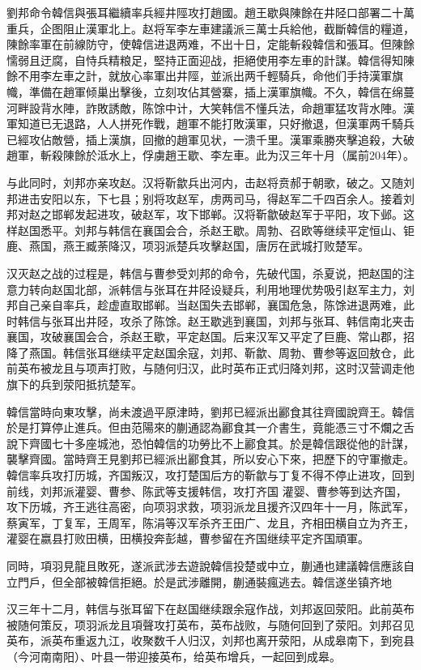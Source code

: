 劉邦命令韓信與張耳繼續率兵經井陘攻打趙國。趙王歇與陳餘在井陉口部署二十萬重兵，企图阻止漢軍北上。赵将军李左車建議派三萬士兵給他，截斷韓信的糧道，陳餘率軍在前線防守，使韓信进退两难，不出十日，定能斬殺韓信和張耳。但陳餘懦弱且迂腐，自恃兵精粮足，堅持正面迎战，拒絕使用李左車的計謀。韓信得知陳餘不用李左車之計，就放心率軍出井陘，並派出两千輕騎兵，命他们手持漢軍旗幟，準備在趙軍倾巢出擊後，立刻攻佔其營寨，插上漢軍旗幟。不久，韓信在绵蔓河畔設背水陣，詐敗誘敵，陈馀中计，大笑韩信不懂兵法，命趙軍猛攻背水陣。漢軍知道已无退路，人人拼死作戰，趙軍不能打敗漢軍，只好撤退，但漢軍两千騎兵已經攻佔敵營，插上漢旗，回撤的趙軍见状，一溃千里。漢軍乘勝夾擊追殺，大破趙軍，斬殺陳餘於泜水上，俘虜趙王歇、李左車。此为汉三年十月（属前204年）。

与此同时，刘邦亦亲攻赵。汉将靳歙兵出河内，击赵将贲郝于朝歌，破之。又随刘邦进击安阳以东，下七县；别将攻赵军，虏两司马，得赵军二千四百余人。接着刘邦对赵之邯郸发起进攻，破赵军，攻下邯郸。汉将靳歙破赵军于平阳，攻下邺。这样赵国悉平。刘邦与韩信在襄国会合，杀赵王歇。周勃、召欧等继续平定恒山、钜鹿、燕国，燕王臧荼降汉，项羽派楚兵攻擊赵国，唐厉在武城打败楚军。

汉灭赵之战的过程是，韩信与曹参受刘邦的命令，先破代国，杀夏说，把赵国的注意力转向赵国北部，派韩信与张耳在井陉设疑兵，利用地理优势吸引赵军主力，刘邦自己亲自率兵，趁虚直取邯郸。当赵国失去邯郸，襄国危急，陈馀进退两难，此时韩信与张耳出井陉，攻杀了陈馀。赵王歇逃到襄国，刘邦与张耳、韩信南北夹击襄国，攻破襄国会合，杀赵王歇，平定赵国。后来汉军又平定了巨鹿、常山郡，招降了燕国。韩信张耳继续平定赵国余寇，刘邦、靳歙、周勃、曹参等返回敖仓，此前英布被龙且与项声打败，与随何归汉，此时英布正式归降刘邦，这时汉营调走他旗下的兵到荥阳抵抗楚军。

韓信當時向東攻擊，尚未渡過平原津時，劉邦已經派出酈食其往齊國說齊王。韓信於是打算停止進兵。但由范陽來的蒯通認為酈食其一介書生，竟能憑三寸不爛之舌說下齊國七十多座城池，恐怕韓信的功勞比不上酈食其。於是韓信跟從他的計謀，襲擊齊國。當時齊王見劉邦已經派出酈食其，所以安心下來，把歷下的守軍撤走。 韓信率兵攻打历城，齐国叛汉，攻打楚国后方的靳歙与丁复不得不停止进攻，回到前线，刘邦派灌婴、曹参、陈武等支援韩信，攻打齐国 灌婴、曹参等到达齐国，攻下历城，齐王逃往高密，向项羽求救，项羽派龙且援齐汉四年十一月，陈武军，蔡寅军，丁复军，王周军，陈涓等汉军杀齐王田广、龙且，齐相田横自立为齐王，灌婴在嬴县打败田横，田横投奔彭越，曹参留在齐国继续平定齐国頑軍。

同時，項羽見龍且敗死，遂派武涉去遊說韓信投楚或中立，蒯通也建議韓信應該自立門戶，但全部被韓信拒絕。於是武涉離開，蒯通裝瘋逃去。韓信遂坐镇齐地

汉三年十二月，韩信与张耳留下在赵国继续跟余寇作战，刘邦返回荥阳。此前英布被随何策反，项羽派龙且項聲攻打英布，英布战败，与随何回到了荥阳。刘邦召见英布，派英布重返九江，收聚数千人归汉，刘邦也离开荥阳，从成皋南下，到宛县（今河南南阳）、叶县一带迎接英布，给英布增兵，一起回到成皋。

